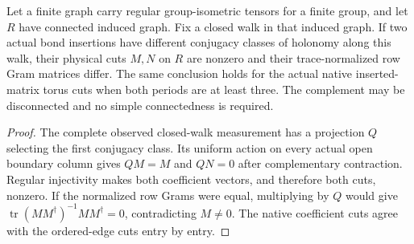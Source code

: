 \begin{lemma}
    \label{lem:peps_wilson_density_obstruction}
    \leanok
    Let a finite graph carry regular group-isometric tensors for a finite
    group, and let $R$ have connected induced graph. Fix a closed walk in
    that induced graph. If two actual bond insertions have different
    conjugacy classes of holonomy along this walk, their physical cuts
    $M,N$ on $R$ are nonzero and their trace-normalized row Gram matrices
    differ. The same conclusion holds for the actual native inserted-matrix
    torus cuts when both periods are at least three.
    The complement may be disconnected and no simple connectedness is required.
\end{lemma}
\begin{proof}\leanok
    The complete observed closed-walk measurement has a projection $Q$
    selecting the first conjugacy class. Its uniform action on every actual
    open boundary column gives $QM=M$ and $QN=0$ after complementary contraction.
    Regular injectivity makes both coefficient vectors, and therefore both
    cuts, nonzero. If the normalized row Grams were equal, multiplying
    by $Q$ would give
    $\operatorname{tr}(MM^\dagger)^{-1}MM^\dagger=0$, contradicting $M\ne0$.
    The native coefficient cuts agree with the ordered-edge cuts entry by entry.
\end{proof}


